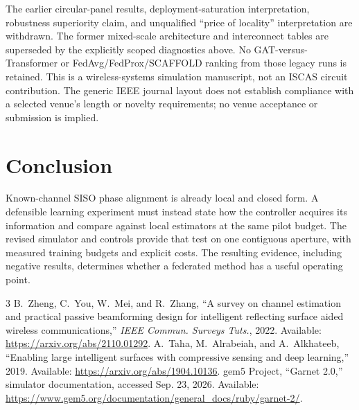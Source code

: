 \documentclass[journal]{IEEEtran}
\begin{document}
The earlier circular-panel results, deployment-saturation interpretation, robustness superiority claim, and unqualified ``price of locality'' interpretation are withdrawn. The former mixed-scale architecture and interconnect tables are superseded by the explicitly scoped diagnostics above. No GAT-versus-Transformer or FedAvg/FedProx/SCAFFOLD ranking from those legacy runs is retained. This is a wireless-systems simulation manuscript, not an ISCAS circuit contribution. The generic IEEE journal layout does not establish compliance with a selected venue's length or novelty requirements; no venue acceptance or submission is implied.

\section{Conclusion}
Known-channel SISO phase alignment is already local and closed form. A defensible learning experiment must instead state how the controller acquires its information and compare against local estimators at the same pilot budget. The revised simulator and controls provide that test on one contiguous aperture, with measured training budgets and explicit costs. The resulting evidence, including negative results, determines whether a federated method has a useful operating point.

\begin{thebibliography}{3}
 B.~Zheng, C.~You, W.~Mei, and R.~Zhang, ``A survey on channel estimation and practical passive beamforming design for intelligent reflecting surface aided wireless communications,'' \emph{IEEE Commun. Surveys Tuts.}, 2022. Available: \url{https://arxiv.org/abs/2110.01292}.
 A.~Taha, M.~Alrabeiah, and A.~Alkhateeb, ``Enabling large intelligent surfaces with compressive sensing and deep learning,'' 2019. Available: \url{https://arxiv.org/abs/1904.10136}.
 gem5 Project, ``Garnet 2.0,'' simulator documentation, accessed Sep. 23, 2026. Available: \url{https://www.gem5.org/documentation/general_docs/ruby/garnet-2/}.
\end{thebibliography}
\end{document}
